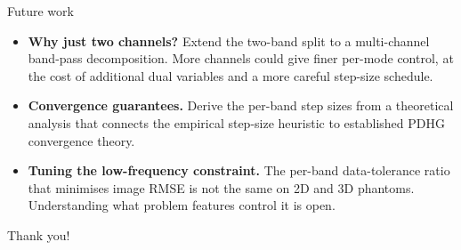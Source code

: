 \documentclass[aspectratio=169,xcolor=dvipsnames]{beamer}
\begin{document}
\begin{frame}{Future work}
  \begin{itemize}
    \item \textbf{Why just two channels?} Extend the two-band split to a
          multi-channel band-pass decomposition. More channels could
          give finer per-mode control, at the cost of additional dual
          variables and a more careful step-size schedule.
    \item \textbf{Convergence guarantees.} Derive the per-band step
          sizes from a theoretical analysis that connects the empirical
          step-size heuristic to established PDHG convergence theory.
    \item \textbf{Tuning the low-frequency constraint.} The per-band
          data-tolerance ratio that minimises image RMSE is not the
          same on 2D and 3D phantoms. Understanding what problem
          features control it is open.
  \end{itemize}
\end{frame}

\begin{frame}[standout]
  Thank you!
\end{frame}

\appendix
\end{document}
